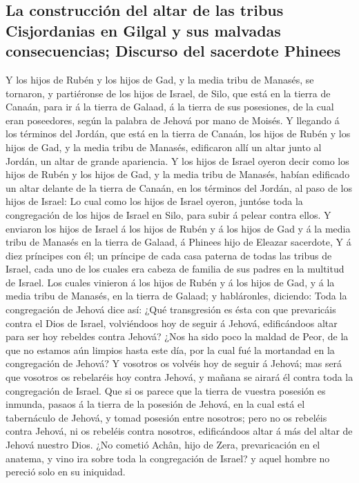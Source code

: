 \hypertarget{la-construcciuxf3n-del-altar-de-las-tribus-cisjordanias-en-gilgal-y-sus-malvadas-consecuencias-discurso-del-sacerdote-phinees}{%
\subsection{La construcción del altar de las tribus Cisjordanias en
Gilgal y sus malvadas consecuencias; Discurso del sacerdote
Phinees}\label{la-construcciuxf3n-del-altar-de-las-tribus-cisjordanias-en-gilgal-y-sus-malvadas-consecuencias-discurso-del-sacerdote-phinees}}

 Y los hijos de Rubén y los hijos de Gad, y la media tribu
de Manasés, se tornaron, y partiéronse de los hijos de Israel, de Silo,
que está en la tierra de Canaán, para ir á la tierra de Galaad, á la
tierra de sus posesiones, de la cual eran poseedores, según la palabra
de Jehová por mano de Moisés.  Y llegando á los términos
del Jordán, que está en la tierra de Canaán, los hijos de Rubén y los
hijos de Gad, y la media tribu de Manasés, edificaron allí un altar
junto al Jordán, un altar de grande apariencia.  Y los
hijos de Israel oyeron decir como los hijos de Rubén y los hijos de Gad,
y la media tribu de Manasés, habían edificado un altar delante de la
tierra de Canaán, en los términos del Jordán, al paso de los hijos de
Israel:  Lo cual como los hijos de Israel oyeron, juntóse
toda la congregación de los hijos de Israel en Silo, para subir á pelear
contra ellos.  Y enviaron los hijos de Israel á los hijos
de Rubén y á los hijos de Gad y á la media tribu de Manasés en la tierra
de Galaad, á Phinees hijo de Eleazar sacerdote,  Y á diez
príncipes con él; un príncipe de cada casa paterna de todas las tribus
de Israel, cada uno de los cuales era cabeza de familia de sus padres en
la multitud de Israel.  Los cuales vinieron á los hijos
de Rubén y á los hijos de Gad, y á la media tribu de Manasés, en la
tierra de Galaad; y habláronles, diciendo:  Toda la
congregación de Jehová dice así: ¿Qué transgresión es ésta con que
prevaricáis contra el Dios de Israel, volviéndoos hoy de seguir á
Jehová, edificándoos altar para ser hoy rebeldes contra Jehová?
 ¿Nos ha sido poco la maldad de Peor, de la que no
estamos aún limpios hasta este día, por la cual fué la mortandad en la
congregación de Jehová?  Y vosotros os volvéis hoy de
seguir á Jehová; mas será que vosotros os rebelaréis hoy contra Jehová,
y mañana se airará él contra toda la congregación de Israel.
 Que si os parece que la tierra de vuestra posesión es
inmunda, pasaos á la tierra de la posesión de Jehová, en la cual está el
tabernáculo de Jehová, y tomad posesión entre nosotros; pero no os
rebeléis contra Jehová, ni os rebeléis contra nosotros, edificándoos
altar á más del altar de Jehová nuestro Dios.  ¿No
cometió Achân, hijo de Zera, prevaricación en el anatema, y vino ira
sobre toda la congregación de Israel? y aquel hombre no pereció solo en
su iniquidad.

